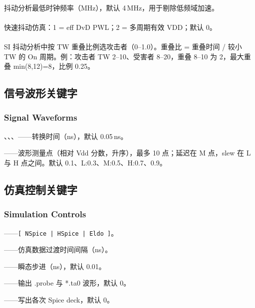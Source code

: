 \paragraph{}
抖动分析最低时钟频率（MHz），默认 4\,MHz，用于剔除低频域加速。

\paragraph{}
快速抖动仿真：1 = eff DvD PWL；2 = 多周期有效 VDD；默认 0。

\paragraph{}
SI 抖动分析中按 TW 重叠比例选攻击者（0--1.0）。重叠比 = 重叠时间 / 较小 TW 的 On 周期。例：攻击者 TW 2--10、受害者 8--20，重叠 8--10 为 2，最大重叠 min(8,12)=8，比例 0.25。

\subsection{信号波形关键字}
\subsubsection*{Signal Waveforms}

、、、——转换时间（ns），默认 0.05\,ns。

——波形测量点（相对 Vdd 分数，升序），最多 10 点；延迟在 M 点，slew 在 L 与 H 点之间。默认 0.1、L:0.3、M:0.5、H:0.7、0.9。

\subsection{仿真控制关键字}
\subsubsection*{Simulation Controls}

——\texttt{[ NSpice | HSpice | Eldo ]}。

——仿真数据过渡时间间隔（ns）。

——瞬态步进（ns），默认 0.01。

——输出 .probe 与 *.ta0 波形，默认 0。

——写出各次 Spice deck，默认 0。

